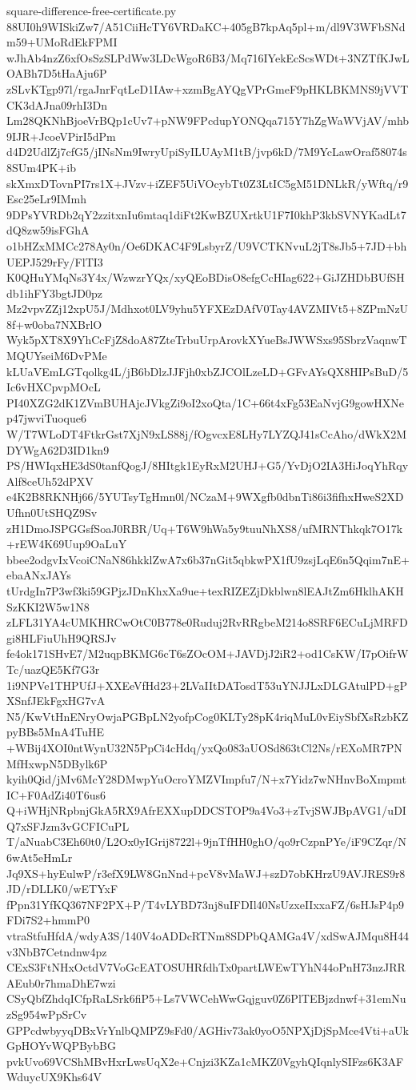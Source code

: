 \documentclass[11pt]{article}
\theoremstyle{definition}
\theoremstyle{remark}
\begin{document}
\begin{filecontents*}[overwrite]{square-difference-free-certificate.py}
88UI0h9WISkiZw7/A51CiiHcTY6VRDaKC+405gB7kpAq5pl+m/dl9V3WFbSNdm59+UMoRdEkFPMI
wJhAb4nzZ6xfOsSzSLPdWw3LDcWgoR6B3/Mq716IYekEcScsWDt+3NZTfKJwLOABh7D5tHaAju6P
zSLvKTgp97l/rgaJnrFqtLeD1IAw+xzmBgAYQgVPrGmeF9pHKLBKMNS9jVVTCK3dAJna09rhI3Dn
Lm28QKNhBjoeVrBQp1cUv7+pNW9FPcdupYONQqa715Y7hZgWaWVjAV/mhb9IJR+JcoeVPirI5dPm
d4D2UdlZj7cfG5/jINsNm9IwryUpiSyILUAyM1tB/jvp6kD/7M9YcLawOraf58074s8SUm4PK+ib
skXmxDTovnPI7rs1X+JVzv+iZEF5UiVOcybTt0Z3LtIC5gM51DNLkR/yWftq/r9Esc25eLr9IMmh
9DPsYVRDb2qY2zzitxnIu6mtaq1diFt2KwBZUXrtkU1F7I0khP3kbSVNYKadLt7dQ8zw59isFGhA
o1bHZxMMCc278Ay0n/Oe6DKAC4F9LsbyrZ/U9VCTKNvuL2jT8sJb5+7JD+bhUEPJ529rFy/FlTI3
K0QHuYMqNs3Y4x/WzwzrYQx/xyQEoBDisO8efgCcHIag622+GiJZHDbBUfSHdb1ihFY3bgtJD0pz
Mz2vpvZZj12xpU5J/Mdhxot0LV9yhu5YFXEzDAfV0Tay4AVZMIVt5+8ZPmNzU8f+w0oba7NXBrlO
Wyk5pXT8X9YhCcFjZ8doA87ZteTrbuUrpArovkXYueBsJWWSxs95SbrzVaqnwTMQUYseiM6DvPMe
kLUaVEmLGTqolkg4L/jB6bDlzJJFjh0xbZJCOlLzeLD+GFvAYsQX8HIPsBuD/5Ic6vHXCpvpMOcL
PI40XZG2dK1ZVmBUHAjcJVkgZi9oI2xoQta/1C+66t4xFg53EaNvjG9gowHXNep47jwviTuoque6
W/T7WLoDT4FtkrGst7XjN9xLS88j/fOgvcxE8LHy7LYZQJ41sCcAho/dWkX2MDYWgA62D3ID1kn9
PS/HWIqxHE3dS0tanfQogJ/8HItgk1EyRxM2UHJ+G5/YvDjO2IA3HiJoqYhRqyAlf8ceUh52dPXV
e4K2B8RKNHj66/5YUTsyTgHmn0l/NCzaM+9WXgfb0dbnTi86i3fifhxHweS2XDUfhn0UtSHQZ9Sv
zH1DmoJSPGGsfSoaJ0RBR/Uq+T6W9hWa5y9tuuNhXS8/ufMRNThkqk7O17k+rEW4K69Uup9OaLuY
bbee2odgvIxVcoiCNaN86hkklZwA7x6b37nGit5qbkwPX1fU9zsjLqE6n5Qqim7nE+ebaANxJAYs
tUrdgIn7P3wf3ki59GPjzJDnKhxXa9ue+texRIZEZjDkblwn8lEAJtZm6HklhAKHSzKKI2W5w1N8
zLFL31YA4cUMKHRCwOtC0B778e0Ruduj2RvRRgbeM214o8SRF6ECuLjMRFDgi8HLFiuUhH9QRSJv
fe4ok171SHvE7/M2uqpBKMG6cT6sZOcOM+JAVDjJ2iR2+od1CsKW/I7pOifrWTc/uazQE5Kf7G3r
1i9NPVe1THPUfJ+XXEeVfHd23+2LVaIItDATosdT53uYNJJLxDLGAtulPD+gPXSnfJEkFgxHG7vA
N5/KwVtHnENryOwjaPGBpLN2yofpCog0KLTy28pK4riqMuL0vEiySbfXsRzbKZpyBBs5MnA4TuHE
+WBij4XOI0ntWynU32N5PpCi4cHdq/yxQo083aUOSd863tCl2Ns/rEXoMR7PNMfHxwpN5DBylk6P
kyih0Qid/jMv6McY28DMwpYuOcroYMZVImpfu7/N+x7Yidz7wNHnvBoXmpmtIC+F0AdZi40T6us6
Q+iWHjNRpbnjGkA5RX9AfrEXXupDDCSTOP9a4Vo3+zTvjSWJBpAVG1/uDIQ7xSFJzm3vGCFICuPL
T/aNuabC3Eh60t0/L2Ox0yIGrij8722l+9jnTfHH0ghO/qo9rCzpnPYe/iF9CZqr/N6wAt5eHmLr
Jq9XS+hyEulwP/r3efX9LW8GnNnd+pcV8vMaWJ+szD7obKHrzU9AVJRES9r8JD/rDLLK0/wETYxF
fPpn31YfKQ367NF2PX+P/T4vLYBD73nj8uIFDIl40NsUzxeIIxxaFZ/6sHJsP4p9FDi7S2+hmmP0
vtraStfuHfdA/wdyA3S/140V4oADDcRTNm8SDPbQAMGa4V/xdSwAJMqu8H44v3NbB7Cetndnw4pz
CExS3FtNHxOctdV7VoGcEATOSUHRfdhTx0partLWEwTYhN44oPnH73nzJRRAEub0r7hmaDhE7wzi
CSyQbfZhdqICfpRaLSrk6fiP5+Ls7VWCehWwGqjguv0Z6PlTEBjzdnwf+31emNuzSg954wPpSrCv
GPPcdwbyyqDBxVrYnlbQMPZ9sFd0/AGHiv73ak0yoO5NPXjDjSpMce4Vti+aUkGpHOYvWQPBybBG
pvkUvo69VCShMBvHxrLwsUqX2e+Cnjzi3KZa1cMKZ0VgyhQIqnlySIFzs6K3AFWduycUX9Khs64V

\end{filecontents*}
\end{document}
